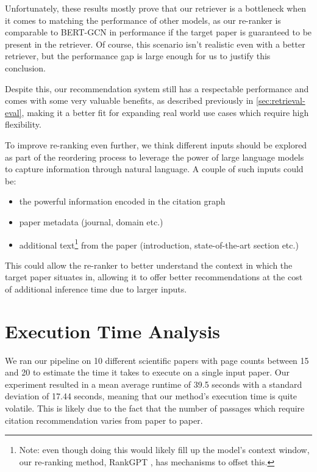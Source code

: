 \documentclass[12pt,a4paper]{report}
\begin{document}
Unfortunately, these results mostly prove that our retriever is a bottleneck when it comes to matching the performance of other models, as our re-ranker is comparable to BERT-GCN \cite{Jeong2019ACC} in performance if the target paper is guaranteed to be present in the retriever. Of course, this scenario isn't realistic even with a better retriever, but the performance gap is large enough for us to justify this conclusion.

Despite this, our recommendation system still has a respectable performance and comes with some very valuable benefits, as described previously in \autoref{sec:retrieval-eval}, making it a better fit for expanding real world use cases which require high flexibility.

To improve re-ranking even further, we think different inputs should be explored as part of the reordering process to leverage the power of large language models to capture information through natural language. A couple of such inputs could be:

\begin{itemize}
    \item the powerful information encoded in the citation graph
    \item paper metadata (journal, domain etc.)
    \item additional text\footnote{Note: even though doing this would likely fill up the model's context window, our re-ranking method, RankGPT \cite{Sun2023IsCG,Sun2023InstructionDM}, has mechanisms to offset this.} from the paper (introduction, state-of-the-art section etc.)
\end{itemize}

This could allow the re-ranker to better understand the context in which the target paper situates in, allowing it to offer better recommendations at the cost of additional inference time due to larger inputs.

\section{Execution Time Analysis}

We ran our pipeline on 10 different scientific papers with page counts between 15 and 20 to estimate the time it takes to execute on a single input paper. Our experiment resulted in a mean average runtime of 39.5 seconds with a standard deviation of 17.44 seconds, meaning that our method's execution time is quite volatile. This is likely due to the fact that the number of passages which require citation recommendation varies from paper to paper.
\end{document}
